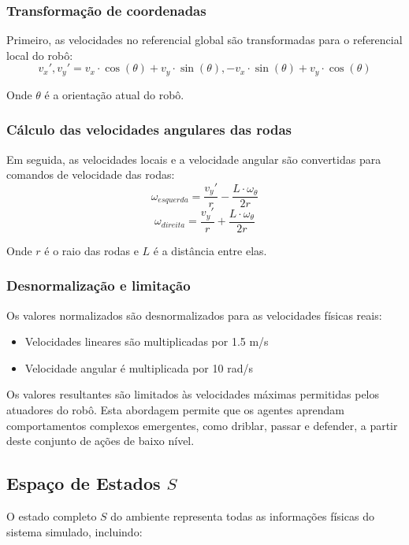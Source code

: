 \subsubsection{Transformação de coordenadas}

Primeiro, as velocidades no referencial global são transformadas para o referencial local do robô:
$$v_x', v_y' = v_x \cdot \cos(\theta) + v_y \cdot \sin(\theta), -v_x \cdot \sin(\theta) + v_y \cdot \cos(\theta)$$

Onde $\theta$ é a orientação atual do robô.

\subsubsection{Cálculo das velocidades angulares das rodas}

Em seguida, as velocidades locais e a velocidade angular são convertidas para comandos de velocidade das rodas:
$$\omega_{esquerda} = \frac{v_y'}{r} - \frac{L \cdot \omega_{\theta}}{2r}$$
$$\omega_{direita} = \frac{v_y'}{r} + \frac{L \cdot \omega_{\theta}}{2r}$$

Onde $r$ é o raio das rodas e $L$ é a distância entre elas.

\subsubsection{Desnormalização e limitação}

Os valores normalizados são desnormalizados para as velocidades físicas reais:
\begin{itemize}
    \item Velocidades lineares são multiplicadas por 1.5 m/s
    \item Velocidade angular é multiplicada por 10 rad/s
\end{itemize}

Os valores resultantes são limitados às velocidades máximas permitidas pelos atuadores do robô. Esta abordagem permite que os agentes aprendam comportamentos complexos emergentes, como driblar, passar e defender, a partir deste conjunto de ações de baixo nível.

\subsection{Espaço de Estados $S$}

O estado completo $S$ do ambiente representa todas as informações físicas do sistema simulado, incluindo:

